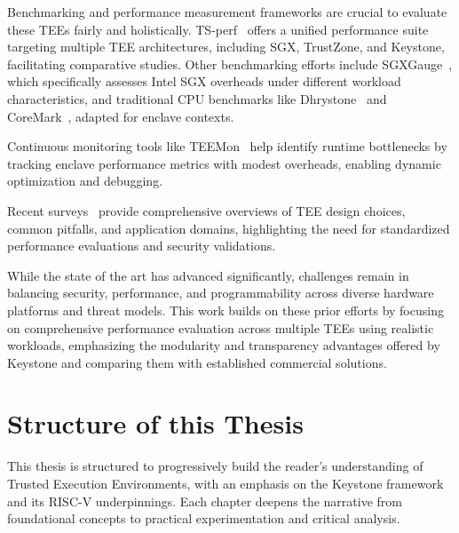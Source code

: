Benchmarking and performance measurement frameworks are crucial to evaluate these TEEs fairly and holistically. TS-perf~\cite{suzaki2021tsperf} offers a unified performance suite targeting multiple TEE architectures, including SGX, TrustZone, and Keystone, facilitating comparative studies. Other benchmarking efforts include SGXGauge~\cite{kumar2022sgxgauge}, which specifically assesses Intel SGX overheads under different workload characteristics, and traditional CPU benchmarks like Dhrystone~\cite{weiss2002dhrystone, york2002benchmarking} and CoreMark~\cite{gal2012exploring}, adapted for enclave contexts.

Continuous monitoring tools like TEEMon~\cite{krahn2020teemon} help identify runtime bottlenecks by tracking enclave performance metrics with modest overheads, enabling dynamic optimization and debugging.

Recent surveys~\cite{Survey2023, turn0search5} provide comprehensive overviews of TEE design choices, common pitfalls, and application domains, highlighting the need for standardized performance evaluations and security validations.

While the state of the art has advanced significantly, challenges remain in balancing security, performance, and programmability across diverse hardware platforms and threat models. This work builds on these prior efforts by focusing on comprehensive performance evaluation across multiple TEEs using realistic workloads, emphasizing the modularity and transparency advantages offered by Keystone and comparing them with established commercial solutions.

\section{Structure of this Thesis}

This thesis is structured to progressively build the reader’s understanding of Trusted Execution Environments, with an emphasis on the Keystone framework and its RISC-V underpinnings. Each chapter deepens the narrative from foundational concepts to practical experimentation and critical analysis.


